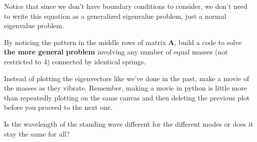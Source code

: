 \begin{enumerate}
\begin{enumerate}
Notice that since we don't have boundary conditions to consider, we
don't need to write this equation as a generalized eigenvalue problem,
just a normal eigenvalue problem.

\subprob  By noticing the pattern in the middle rows of matrix
$\textbf{A}$, build a code to solve \textbf{the more general problem} involving any
number of equal masses (not restricted to 4) connected by identical springs.  

\subprob Instead of plotting the eigenvectors like we've done in the
past, make a movie of the masses as they vibrate.  Remember, making a
movie in python is little more than repeatedly plotting on the same
canvas and then deleting the previous plot before you proceed to the
next one.

\subprob Is the wavelength of the standing wave different for the
different modes or does it stay the same for all?
\end{enumerate}
\end{enumerate}

